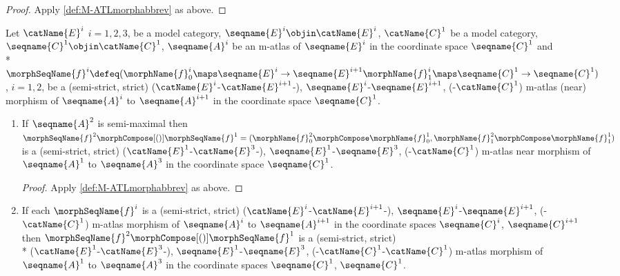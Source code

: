 \documentclass{article}
\begin{document}
\begin{corollary}
\begin{enumerate}
\begin{proof}
Apply \cref{def:M-ATLmorphabbrev} as above.
\end{proof}
\end{enumerate}

Let $\catName{E}^i$ $i=1,2,3$, be a model category,
$\seqname{E}^i \objin \catName{E}^i$,
$\catName{C}^1$ be a model category,
$\seqname{C}^1 \objin \catName{C}^1$, $\seqname{A}^i$ be an m-atlas of
$\seqname{E}^i$ in the coordinate space $\seqname{C}^1$ and \\*
\nobreaks
  {{
    $
      \morphSeqName{f}^i \defeq
        (
          \morphName{f}^i_0 \maps \seqname{E}^i \to \seqname{E}^{i+1}
          \morphName{f}^i_1 \maps \seqname{C}^1 \to \seqname{C}^1
        )
    $,
  }}
$i=1,2$,
be a (semi-strict, strict)
\nobreaks
  {
    {($\catName{E}^i$-$\catName{E}^{i+1}$-)},
    {$\seqname{E}^i$-$\seqname{E}^{i+1}$},
    {(-$\catName{C}^1$)}
  }
m-atlas (near) morphism of
$\seqname{A}^i$ to $\seqname{A}^{i+1}$ in the coordinate space
$\seqname{C}^1$.

\begin{enumerate}[resume]
\item
If $\seqname{A}^2$ is semi-maximal then
$
  \morphSeqName{f}^2 \morphCompose[()] \morphSeqName{f}^1 =
    (
      \morphName{f}^2_0 \morphCompose \morphName{f}^1_0,
      \morphName{f}^2_1 \morphCompose \morphName{f}^1_1
    )
$
is a (semi-strict, strict)
\nobreaks
  {
    {($\catName{E}^1$-$\catName{E}^3$-)},
    {$\seqname{E}^1$-$\seqname{E}^3$},
    {(-$\catName{C}^1$)}
  }
m-atlas near morphism of
$\seqname{A}^1$ to $\seqname{A}^3$ in the coordinate space
$\seqname{C}^1$.

\begin{proof}
Apply \cref{def:M-ATLmorphabbrev} as above.
\end{proof}

\item
If each $\morphSeqName{f}^i$ is a (semi-strict, strict)
\nobreaks
  {
    {($\catName{E}^i$-$\catName{E}^{i+1}$-)},
    {$\seqname{E}^i$-$\seqname{E}^{i+1}$},
    {(-$\catName{C}^1$)}
  }
m-atlas morphism of $\seqname{A}^i$ to $\seqname{A}^{i+1}$ in the
coordinate spaces $\seqname{C}^i$, $\seqname{C}^{i+1}$ then
$\morphSeqName{f}^2 \morphCompose[()] \morphSeqName{f}^1$ is a (semi-strict,
strict) \\*
\nobreaks
  {
    {($\catName{E}^1$-$\catName{E}^3$-)},
    {$\seqname{E}^1$-$\seqname{E}^3$},
    {(-$\catName{C}^1$-$\catName{C}^1$)}
  }
m-atlas morphism of $\seqname{A}^1$ to $\seqname{A}^3$ in the coordinate
spaces $\seqname{C}^1$, $\seqname{C}^1$.


\end{enumerate}
\end{corollary}
\end{document}
